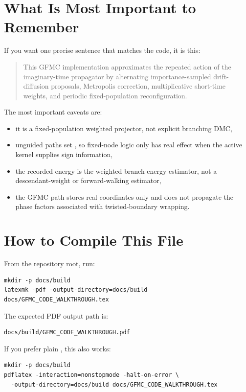 \documentclass[11pt]{article}
\newcommand{\code}[1]{\texttt{\detokenize{#1}}}
\begin{document}
\section{What Is Most Important to Remember}

If you want one precise sentence that matches the code, it is this:

\begin{quote}
This GFMC implementation approximates the repeated action of the
imaginary-time propagator by alternating importance-sampled drift-diffusion
proposals, Metropolis correction, multiplicative short-time weights, and
periodic fixed-population reconfiguration.
\end{quote}

The most important caveats are:
\begin{itemize}
    \item it is a fixed-population weighted projector, not explicit branching
    DMC,
    \item unguided paths set \code{sign = 1.0}, so fixed-node logic only has
    real effect when the active kernel supplies sign information,
    \item the recorded energy is the weighted branch-energy estimator, not a
    descendant-weight or forward-walking estimator,
    \item the GFMC path stores real coordinates only and does not propagate the
    phase factors associated with twisted-boundary wrapping.
\end{itemize}

\section{How to Compile This File}

From the repository root, run:

\begin{lstlisting}[style=codeblock]
mkdir -p docs/build
latexmk -pdf -output-directory=docs/build docs/GFMC_CODE_WALKTHROUGH.tex
\end{lstlisting}

The expected PDF output path is:

\begin{lstlisting}[style=codeblock]
docs/build/GFMC_CODE_WALKTHROUGH.pdf
\end{lstlisting}

If you prefer plain \code{pdflatex}, this also works:

\begin{lstlisting}[style=codeblock]
mkdir -p docs/build
pdflatex -interaction=nonstopmode -halt-on-error \
  -output-directory=docs/build docs/GFMC_CODE_WALKTHROUGH.tex
\end{lstlisting}
\end{document}
